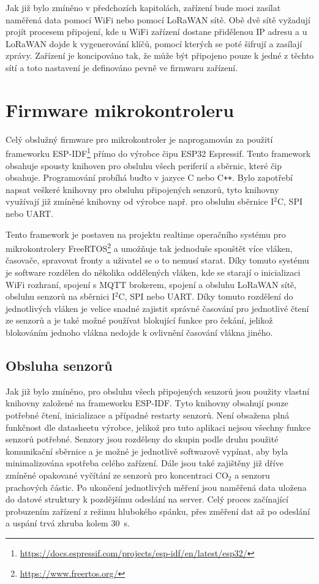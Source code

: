 Jak již bylo zmíněno v předchozích kapitolách, zařízení bude moci zasílat naměřená data pomocí WiFi nebo pomocí LoRaWAN sítě. Obě dvě sítě vyžadují projít procesem připojení, kde u WiFi zařízení dostane přidělenou IP adresu a u LoRaWAN dojde k vygenerování klíčů, pomocí kterých se poté šifrují a zasílají zprávy. Zařízení je koncipováno tak, že může být připojeno pouze k jedné z těchto sítí a toto nastavení je definováno pevně ve firmwaru zařízení. 

\section{Firmware mikrokontroleru}

Celý obslužný firmware pro mikrokontroler je naprogamován za použití frameworku ESP-IDF\footnote{\url{https://docs.espressif.com/projects/esp-idf/en/latest/esp32/}} přímo do výrobce čipu ESP32 Espressif. Tento framework obsahuje spousty knihoven pro obsluhu všech periferií a sběrnic, které čip obsahuje. Programování probíhá buďto v jazyce C nebo C\texttt{++}. Bylo zapotřebí napsat veškeré knihovny pro obsluhu připojených senzorů, tyto knihovny využívají již zmíněné knihovny od výrobce např. pro obsluhu sběrnice I$^2$C, SPI nebo UART.

Tento framework je postaven na projektu realtime operačního systému pro mikrokontrolery FreeRTOS\footnote{\url{https://www.freertos.org/}} a umožňuje tak jednoduše spouštět více vláken, časovače, spravovat fronty a uživatel se o to nemusí starat. Díky tomuto systému je software rozdělen do několika oddělených vláken, kde se starají o inicializaci WiFi rozhraní, spojení s MQTT brokerem, spojení a obsluhu LoRaWAN sítě, obsluhu senzorů na sběrnici I$^2$C, SPI nebo UART. Díky tomuto rozdělení do jednotlivých vláken je velice snadné zajistit správné časování pro jednotlivé čtení ze senzorů a je také možné používat blokující funkce pro čekání, jelikož blokováním jednoho vlákna nedojde k ovlivnění časování vlákna jiného.

\subsection{Obsluha senzorů}

Jak již bylo zmíněno, pro obsluhu všech připojených senzorů jsou použity vlastní knihovny založené na frameworku ESP-IDF. Tyto knihovny obsahují pouze potřebné čtení, inicializace a případné restarty senzorů. Není obsažena plná funkčnost dle datasheetu výrobce, jelikož pro tuto aplikaci nejsou všechny funkce senzorů potřebné. Senzory jsou rozděleny do skupin podle druhu použité komunikační sběrnice a je možné je jednotlivě softwarově vypínat, aby byla minimalizována spotřeba celého zařízení. Dále jsou také zajištěny již dříve zmíněné opakované vyčítání ze senzorů pro koncentraci CO$_2$ a senzoru prachových částic. Po ukončení jednotlivých měření jsou naměřená data uložena do datové struktury k pozdějšímu odeslání na server. Celý proces začínající probuzením zařízení z režimu hlubokého spánku, přes změření dat až po odeslání a uspání trvá zhruba kolem \SI{30}{\second}.

